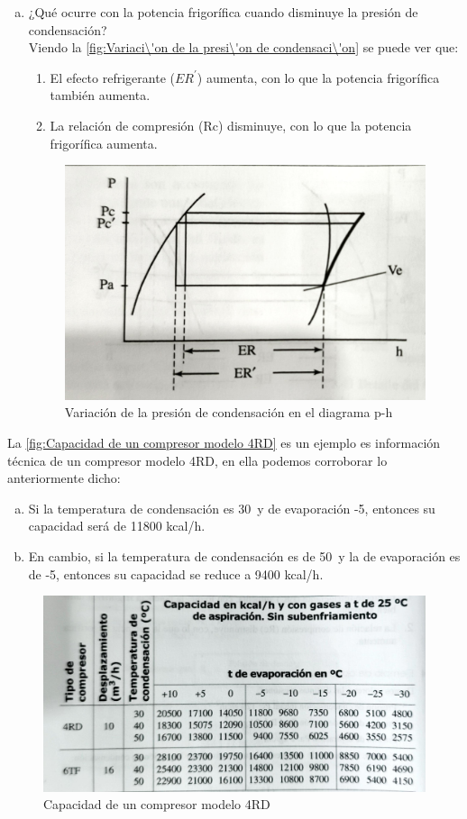 \begin{enumerate}[a.]
	\item ¿Qu\'e ocurre con la potencia frigor\'ifica cuando disminuye la presi\'on de condensaci\'on?\\Viendo la \autoref{fig:Variaci\'on de la presi\'on de condensaci\'on} se puede ver que:
	\begin{enumerate}[1.]
		\item El efecto refrigerante ($ER^\prime$) aumenta, con lo que la potencia frigor\'ifica tambi\'en aumenta.
		\item La relaci\'on de compresi\'on (Rc) disminuye, con lo que la potencia frigor\'ifica aumenta.
	\end{enumerate}
	\begin{figure}[H]
		\centering
		\includegraphics[width=.6\textwidth]{figuras/compresores/variacion de la presion de condensacion.jpg}
		\caption{Variaci\'on de la presi\'on de condensaci\'on en el diagrama p-h}
		\label{fig:Variaci\'on de la presi\'on de condensaci\'on}
	\end{figure}
\end{enumerate}
La \autoref{fig:Capacidad de un compresor modelo 4RD} es un ejemplo es informaci\'on t\'ecnica de un compresor modelo 4RD, en ella podemos corroborar lo anteriormente dicho:
\begin{enumerate}[a.]
	\item Si la temperatura de condensaci\'on es 30\textcelsius\ y de evaporaci\'on -5\textcelsius, entonces su capacidad ser\'a de 11800 kcal/h.
	\item En cambio, si la temperatura de condensaci\'on es de 50\textcelsius\ y la de evaporaci\'on es de -5\textcelsius, entonces su capacidad se reduce a 9400 kcal/h.
\end{enumerate}
\begin{figure}[h]
	\centering
	\includegraphics[width=\linewidth]{figuras/compresores/tabla de capacidad de un compresor.jpg}
	\caption{Capacidad de un compresor modelo 4RD}
	\label{fig:Capacidad de un compresor modelo 4RD}
\end{figure}

